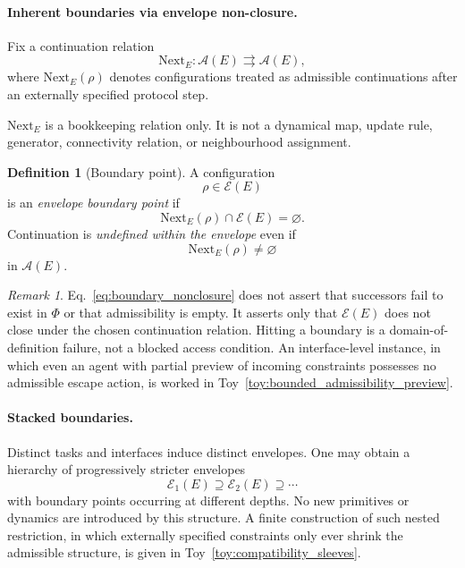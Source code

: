 \documentclass[aps,prx,onecolumn,11pt]{revtex4-2}
\theoremstyle{plain}
\theoremstyle{definition}
\newtheorem{definition}{Definition}
\theoremstyle{remark}
\newtheorem{remark}{Remark}
\begin{document}
\paragraph{Inherent boundaries via envelope non-closure.}

Fix a continuation relation
\[
\mathrm{Next}_E :
\mathcal{A}(E)
\rightrightarrows
\mathcal{A}(E),
\]
where \(\mathrm{Next}_E(\rho)\) denotes configurations treated as
admissible continuations after an externally specified protocol step.

\(\mathrm{Next}_E\) is a bookkeeping relation only. It is not a
dynamical map, update rule, generator, connectivity relation, or
neighbourhood assignment.

\begin{definition}[Boundary point]
\label{def:boundary_point}
A configuration
\[
\rho\in\mathcal{E}(E)
\]
is an \emph{envelope boundary point} if
\begin{equation}
\mathrm{Next}_E(\rho)\cap\mathcal{E}(E)=\varnothing.
\label{eq:boundary_nonclosure}
\end{equation}
Continuation is \emph{undefined within the envelope} even if
\[
\mathrm{Next}_E(\rho)\neq\varnothing
\]
in \(\mathcal{A}(E)\).
\end{definition}

\begin{remark}
\label{rmk:no_prohibition}
Eq.~\eqref{eq:boundary_nonclosure} does not assert that successors fail
to exist in \(\Phi\) or that admissibility is empty. It asserts only
that \(\mathcal{E}(E)\) does not close under the chosen continuation
relation. Hitting a boundary is a domain-of-definition failure, not a
blocked access condition. An interface-level instance, in which even an
agent with partial preview of incoming constraints possesses no
admissible escape action, is worked in
Toy~\ref{toy:bounded_admissibility_preview}.
\end{remark}

\paragraph{Stacked boundaries.}

Distinct tasks and interfaces induce distinct envelopes. One may obtain
a hierarchy of progressively stricter envelopes
\[
\mathcal{E}_1(E)
\supseteq
\mathcal{E}_2(E)
\supseteq
\cdots
\]
with boundary points occurring at different depths. No new primitives
or dynamics are introduced by this structure. A finite construction of
such nested restriction, in which externally specified constraints only
ever shrink the admissible structure, is given in
Toy~\ref{toy:compatibility_sleeves}.
\end{document}
